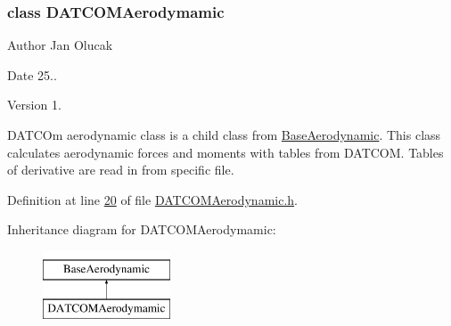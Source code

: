 \subsubsection{class D\+A\+T\+C\+O\+M\+Aerodymamic}
\begin{DoxyAuthor}{Author}
Jan Olucak 
\end{DoxyAuthor}
\begin{DoxyDate}{Date}
25.. 
\end{DoxyDate}
\begin{DoxyVersion}{Version}
1.
\end{DoxyVersion}
D\+A\+T\+C\+Om aerodynamic class is a child class from \hyperlink{group___aerodynamic_class_base_aerodynamic}{Base\+Aerodynamic}. This class calculates aerodynamic forces and moments with tables from D\+A\+T\+C\+OM. Tables of derivative are read in from specific file. 

Definition at line \hyperlink{_d_a_t_c_o_m_aerodynamic_8h_source_l00020}{20} of file \hyperlink{_d_a_t_c_o_m_aerodynamic_8h_source}{D\+A\+T\+C\+O\+M\+Aerodynamic.\+h}.

Inheritance diagram for D\+A\+T\+C\+O\+M\+Aerodymamic\+:\begin{figure}[H]
\begin{center}
\leavevmode
\includegraphics[height=2.000000cm]{group___aerodynamic}
\end{center}
\end{figure}
